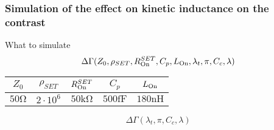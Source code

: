 \documentclass[../main.tex]{subfiles}
\begin{document}
\subsubsection{Simulation of the effect on kinetic inductance on the contrast}
%
%
%
%

\begin{frame}{What to simulate}
\[\Delta\Gamma(Z_{0}, \rho_{SET}, R_{\text{On}}^{SET}, C_{p}, L_{\text{On}}, \lambda_{t}, \pi, C_{c}, \lambda)\]
\begin{table}[H]
    \centering
    \begin{tabular}{c|c|c|c|c}
        \(Z_{0}\) & \(\rho_{SET}\) & \(R_{\text{On}}^{SET}\) & \(C_{p}\) & \(L_{\text{On}}\) \\\hline
        \(50\unit{\ohm}\) & \(2\cdot10^{6}\) & \(50\unit{\kilo\ohm}\) & \(500\unit{\femto\farad}\) & \(180\unit{\nano\henry}\)
    \end{tabular}
\end{table}
\[\Delta\Gamma(\lambda_{t}, \pi, C_{c}, \lambda)\]
\end{frame}
\end{document}
